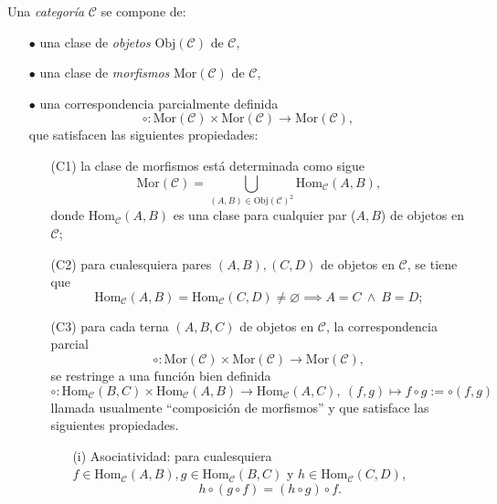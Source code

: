 \documentclass[tesis]{subfiles}
\begin{document}
\begin{Def} \label{Def: Categoría}
    Una \emph{categoría} $\mathscr{C}$ se compone de:
    \begin{itemize}
        \item[$\bullet$] una clase de \emph{objetos} $\text{Obj}(\mathscr{C})$ de $\mathscr{C}$,

        \item[$\bullet$] una clase de \emph{morfismos} $\text{Mor}(\mathscr{C})$ de $\mathscr{C}$,

        \item[$\bullet$] una correspondencia parcialmente definida
            \[
            \circ:\text{Mor}(\mathscr{C})\times\text{Mor}(\mathscr{C})\to \text{Mor}(\mathscr{C}),
            \] 
        que satisfacen las siguientes propiedades:

        \begin{itemize}

            \item[(C1)] la clase de morfismos está determinada como sigue
                \[
                 \text{Mor}(\mathscr{C}) = \bigcup_{(A,B)\in\text{Obj}(\mathscr{C})^2} \text{Hom}_\mathscr{C}(A,B),
                \] 
                donde $\text{Hom}_\mathscr{C}(A,B)$ es una clase para cualquier par ($A,B$) de objetos en $\mathscr{C}$;

            \item[(C2)] para cualesquiera pares $(A,B),(C,D)$ de objetos en $\mathscr{C}$, se tiene que
                \[
                \text{Hom}_\mathscr{C}(A,B) = \text{Hom}_\mathscr{C}(C,D) \neq \varnothing \implies A=C \ \land \ B=D;
                \] 

            \item[(C3)] para cada terna $(A,B,C)$ de objetos en $\mathscr{C}$, la correspondencia parcial
            \[
            \circ:\text{Mor}(\mathscr{C})\times\text{Mor}(\mathscr{C})\to \text{Mor}(\mathscr{C}),
            \] 
            se restringe a una función bien definida
            \[
                \circ: \text{Hom}_\mathscr{C}(B,C)\times\text{Hom}_\mathscr{C}(A,B)\to \text{Hom}_\mathscr{C}(A,C), \ (f,g)\mapsto f\circ g := \circ(f,g)
            \]
            llamada usualmente ``composición de morfismos'' y que satisface las siguientes propiedades.

            \begin{itemize}
                \item[(i)] Asociatividad: para cualesquiera $f\in\text{Hom}_\mathscr{C}(A,B), g\in\text{Hom}_\mathscr{C}(B,C)$ y $h\in\text{Hom}_\mathscr{C}(C,D)$,
                    \[
                        h\circ(g\circ f) = (h\circ g)\circ f.
                    \] 
                    

\end{itemize}
\end{itemize}
\end{itemize}
\end{Def}
\end{document}

